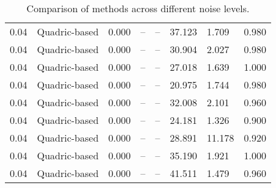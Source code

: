 \begin{table}[H]
\begin{tabular}{l c l l l}
0.04 & Quadric-based & 0.000 & -- & -- & 37.123 & 1.709 & 0.980 \\
0.04 & Quadric-based & 0.000 & -- & -- & 30.904 & 2.027 & 0.980 \\
0.04 & Quadric-based & 0.000 & -- & -- & 27.018 & 1.639 & 1.000 \\
0.04 & Quadric-based & 0.000 & -- & -- & 20.975 & 1.744 & 0.980 \\
0.04 & Quadric-based & 0.000 & -- & -- & 32.008 & 2.101 & 0.960 \\
0.04 & Quadric-based & 0.000 & -- & -- & 24.181 & 1.326 & 0.900 \\
0.04 & Quadric-based & 0.000 & -- & -- & 28.891 & 11.178 & 0.920 \\
0.04 & Quadric-based & 0.000 & -- & -- & 35.190 & 1.921 & 1.000 \\
0.04 & Quadric-based & 0.000 & -- & -- & 41.511 & 1.479 & 0.960 \\
\midrule
\midrule
\bottomrule
\end{tabular}
\label{tab:SyntheticNoise}
\caption{Comparison of methods across different noise levels.}
\end{table}
